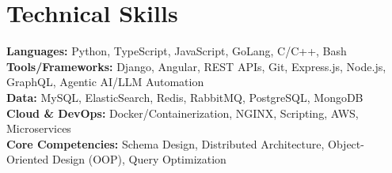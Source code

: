 \documentclass[letterpaper,11pt]{article}
\begin{document}
\section{Technical Skills}
 \begin{itemize}[leftmargin=0.15in, label={}]
    \small{\item{
      \textbf{Languages:} Python, TypeScript, JavaScript, GoLang, C/C++, Bash \\
      \textbf{Tools/Frameworks:} Django, Angular, REST APIs, Git, Express.js, Node.js, GraphQL, Agentic AI/LLM Automation \\
      \textbf{Data:} MySQL, ElasticSearch, Redis, RabbitMQ, PostgreSQL, MongoDB \\
      \textbf{Cloud \& DevOps:} Docker/Containerization, NGINX, Scripting, AWS, Microservices \\
      \textbf{Core Competencies:} Schema Design, Distributed Architecture, Object-Oriented Design (OOP), Query Optimization \\
    }}
 \end{itemize}
\end{document}
